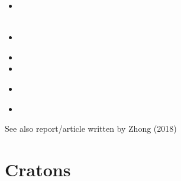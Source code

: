 \begin{small}
\begin{itemize}
\item[\twothousandnineteen] 
\\
\\
\item[\twothousandtwenty] 
\\
\item[\twothousandtwentyone] 
\item[\twothousandtwentytwo] 
\item[\twothousandtwentythree] 
 \\
\item[\twothousandtwentyfour]
\end{itemize}
\end{small}

See also report/article written by Zhong (2018) \textcite{zhon18}

\section{Cratons}

